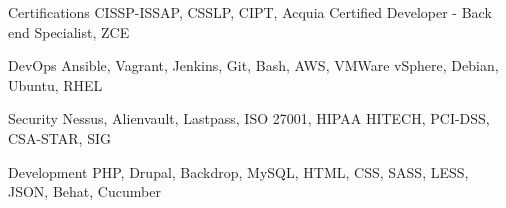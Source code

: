 


\begin{cvskills}


\cvskill
{Certifications}
{CISSP-ISSAP, CSSLP, CIPT, Acquia Certified Developer - Back end Specialist, ZCE }

\cvskill
{DevOps}
{Ansible, Vagrant, Jenkins, Git, Bash, AWS, VMWare vSphere, Debian, Ubuntu, RHEL }

\cvskill
{Security}
{Nessus, Alienvault, Lastpass, ISO 27001, HIPAA HITECH, PCI-DSS, CSA-STAR, SIG }

\cvskill
{Development}
{PHP, Drupal, Backdrop, MySQL, HTML, CSS, SASS, LESS, JSON, Behat, Cucumber }




\end{cvskills}
